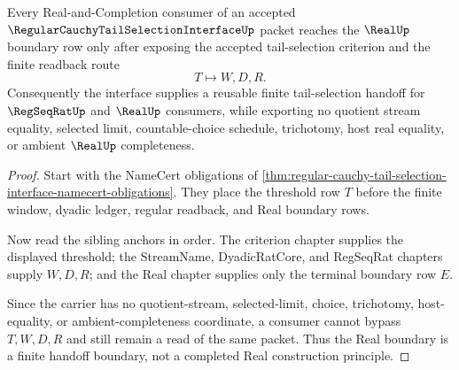 \begin{theorem}
\label{thm:regular-cauchy-tail-selection-interface-real-boundary}
Every Real-and-Completion consumer of an accepted $\RegularCauchyTailSelectionInterfaceUp$ packet reaches the $\RealUp$ boundary row only after exposing the accepted tail-selection criterion and the finite readback route
$$
T\longmapsto W,D,R .
$$
Consequently the interface supplies a reusable finite tail-selection handoff for $\RegSeqRatUp$ and $\RealUp$ consumers, while exporting no quotient stream equality, selected limit, countable-choice schedule, trichotomy, host real equality, or ambient $\RealUp$ completeness.
\end{theorem}
\begin{proof}
Start with the NameCert obligations of \autoref{thm:regular-cauchy-tail-selection-interface-namecert-obligations}. They place the threshold row $T$ before the finite window, dyadic ledger, regular readback, and Real boundary rows.

Now read the sibling anchors in order. The criterion chapter supplies the displayed threshold; the StreamName, DyadicRatCore, and RegSeqRat chapters supply $W,D,R$; and the Real chapter supplies only the terminal boundary row $E$.

Since the carrier has no quotient-stream, selected-limit, choice, trichotomy, host-equality, or ambient-completeness coordinate, a consumer cannot bypass $T,W,D,R$ and still remain a read of the same packet. Thus the Real boundary is a finite handoff boundary, not a completed Real construction principle.
\end{proof}


\begin{closurestatus}{\RegularCauchyTailSelectionInterfaceUp}
  \theoryclosure{\seedClosure}
  \formalstatus{\unformalizedV}
\end{closurestatus}

